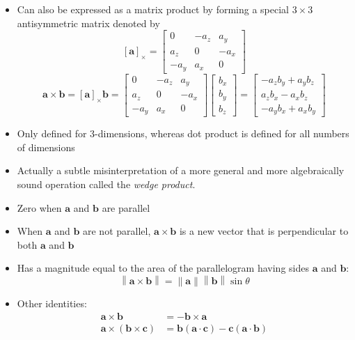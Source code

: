 \documentclass[11pt]{article}
\newcommand{\bm}[1]{\mathbf{#1}}
\newcommand{\norm}[1]{\left\|#1\right\|}
\begin{document}
\begin{itemize}
\item Can also be expressed as a matrix product by forming a special $3 \times 3$ antisymmetric matrix denoted by
    \begin{equation}
        \left[ \bm{a} \right]_\times =
        \begin{bmatrix}
            0 & -a_z & a_y \\
            a_z & 0 & -a_x \\
            -a_y & a_x & 0
        \end{bmatrix}
    \end{equation}
    \begin{equation*}
        \bm{a} \times \bm{b} = \left[\bm{a}\right]_\times \bm{b} =
        \begin{bmatrix}
            0 & -a_z & a_y \\
            a_z & 0 & -a_x \\
            -a_y & a_x & 0
        \end{bmatrix}
        \begin{bmatrix}
            b_x \\
            b_y \\
            b_z
        \end{bmatrix} =
        \begin{bmatrix}
            -a_z b_y + a_y b_z \\
            a_z b_x - a_x b_z \\
            -a_y b_x + a_x b_y
        \end{bmatrix}
    \end{equation*}
\item Only defined for 3-dimensions, whereas dot product is defined for all numbers of dimensions
\item Actually a subtle misinterpretation of a more general and more algebraically sound operation called the \textit{wedge product}.
\item Zero when $\bm{a}$ and $\bm{b}$ are parallel
\item When $\bm{a}$ and $\bm{b}$ are not parallel, $\bm{a} \times \bm{b}$ is a new vector that is perpendicular to both $\bm{a}$ and $\bm{b}$
\item Has a magnitude equal to the area of the parallelogram having sides $\bm{a}$ and $\bm{b}$:
    \begin{equation}
        \norm{\bm{a} \times \bm{b}} = \norm{\bm{a}} \norm{\bm{b}} \sin \theta
    \end{equation}
\item Other identities:
    \begin{align*}
        \bm{a} \times \bm{b} &= -\bm{b} \times \bm{a} \\
        \bm{a} \times \left( \bm{b} \times \bm{c} \right) &=
            \bm{b} \left(\bm{a} \cdot \bm{c} \right)
            - \bm{c} \left(\bm{a} \cdot \bm{b} \right)
    \end{align*}
\end{itemize}
\end{document}

